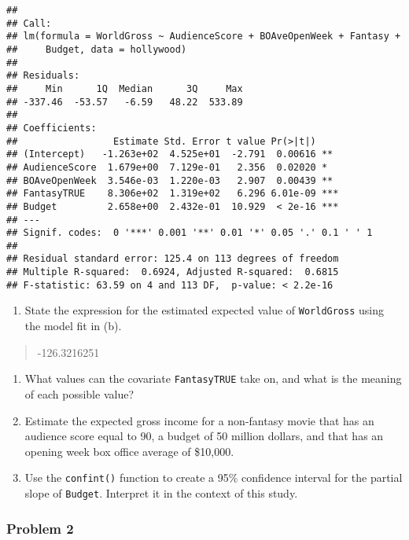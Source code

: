 \documentclass[]{article}
\providecommand{\tightlist}{%
  \setlength{\itemsep}{0pt}\setlength{\parskip}{0pt}}
\begin{document}
\begin{verbatim}
## 
## Call:
## lm(formula = WorldGross ~ AudienceScore + BOAveOpenWeek + Fantasy + 
##     Budget, data = hollywood)
## 
## Residuals:
##     Min      1Q  Median      3Q     Max 
## -337.46  -53.57   -6.59   48.22  533.89 
## 
## Coefficients:
##                 Estimate Std. Error t value Pr(>|t|)    
## (Intercept)   -1.263e+02  4.525e+01  -2.791  0.00616 ** 
## AudienceScore  1.679e+00  7.129e-01   2.356  0.02020 *  
## BOAveOpenWeek  3.546e-03  1.220e-03   2.907  0.00439 ** 
## FantasyTRUE    8.306e+02  1.319e+02   6.296 6.01e-09 ***
## Budget         2.658e+00  2.432e-01  10.929  < 2e-16 ***
## ---
## Signif. codes:  0 '***' 0.001 '**' 0.01 '*' 0.05 '.' 0.1 ' ' 1
## 
## Residual standard error: 125.4 on 113 degrees of freedom
## Multiple R-squared:  0.6924, Adjusted R-squared:  0.6815 
## F-statistic: 63.59 on 4 and 113 DF,  p-value: < 2.2e-16
\end{verbatim}

\begin{enumerate}
\def\labelenumi{\alph{enumi})}
\setcounter{enumi}{2}
\tightlist
\item
  State the expression for the estimated expected value of
  \texttt{WorldGross} using the model fit in (b).
\end{enumerate}

\begin{quote}
-126.3216251
\end{quote}

\begin{enumerate}
\def\labelenumi{\alph{enumi})}
\setcounter{enumi}{3}
\item
  What values can the covariate \texttt{FantasyTRUE} take on, and what
  is the meaning of each possible value?
\item
  Estimate the expected gross income for a non-fantasy movie that has an
  audience score equal to 90, a budget of 50 million dollars, and that
  has an opening week box office average of \$10,000.
\item
  Use the \texttt{confint()} function to create a 95\% confidence
  interval for the partial slope of \texttt{Budget}. Interpret it in the
  context of this study.
\end{enumerate}

\hypertarget{problem-2}{%
\subsubsection{Problem 2}\label{problem-2}}
\end{document}
